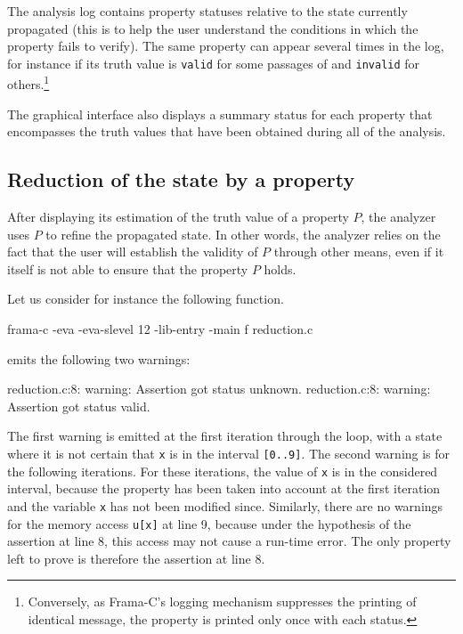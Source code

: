 \documentclass{frama-c-book}
\begin{document}
The analysis log contains property statuses relative to the state
currently propagated (this is to help the user understand the
conditions in which the property fails to verify). The same property
can appear several times in the log, for instance if its truth value is
\lstinline|valid| for some passages of \Eva{} and
\lstinline|invalid| for others.\footnote{Conversely, as Frama-C's
logging mechanism suppresses the printing of identical message,
the property is printed only once with each status.}


The graphical interface also displays a summary status for each
property that encompasses the truth values that have been obtained
during all of the analysis.



\subsection{Reduction of the state by a property}
\label{reduction_proprietes}

After displaying its estimation of the truth value of a property $P$,
the analyzer uses $P$ to refine the propagated state.
In other words, the analyzer relies on the fact that the user will establish
the validity of $P$ through other means, even if it itself is not able to
ensure that the property $P$ holds.

Let us consider for instance the following function.


\begin{frama-c-commands}
frama-c -eva -eva-slevel 12 -lib-entry -main f reduction.c
\end{frama-c-commands}

\Eva{} emits the following two warnings:
\begin{logsmath}
reduction.c:8: warning: Assertion got status unknown.
reduction.c:8: warning: Assertion got status valid.
\end{logsmath}
The first warning is emitted at the first iteration through the loop,
with a state where it is not certain that \lstinline|x| is in the interval
\lstinline|[0..9]|. The second warning is for the following iterations.
For these iterations, the value of \lstinline|x|
is in the considered interval, because the property has been taken into account
at the first iteration and the variable \lstinline|x| has not been modified since.
Similarly, there are no warnings for the memory access \lstinline|u[x]| at
line 9, because under the hypothesis of the assertion at line 8,
this access may not cause a run-time error. The only property left
to prove is therefore the assertion at line 8.
\end{document}
